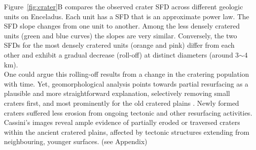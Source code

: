 \documentclass[preprint,11pt,3p,times,authoryear]{elsarticle}
\begin{document}
{Figure~\ref{fig:crater}B compares the observed crater SFD across different geologic units on Enceladus. Each unit has a SFD that is an approximate power law. The SFD slope changes from one unit to another. Among the less densely cratered units (green and blue curves) the slopes are very similar. Conversely, the two SFDs for the most densely cratered units (orange and pink) differ from each other and exhibit a gradual decrease (roll-off) at distinct diameters (around 3$\sim$4 km).\\

One could argue this rolling-off results from a change in the cratering population with time. Yet, geomorphological analysis points towards partial resurfacing as a plausible and more straightforward explanation, selectively removing small craters first, and most prominently for the old cratered plains \citep{Michael2010}. Newly formed craters suffered less erosion from ongoing tectonic and other resurfacing activities. Cassini’s images reveal ample evidence of partially eroded or traversed craters within the ancient cratered plains, affected by tectonic structures extending from neighbouring, younger surfaces. (see Appendix)\\



}
\end{document}
